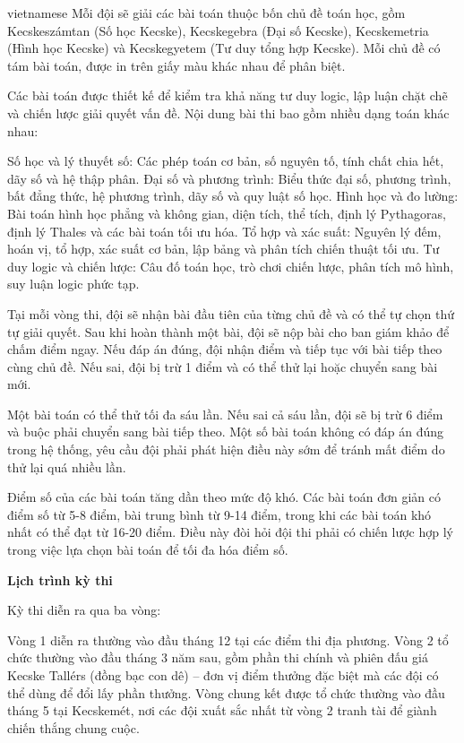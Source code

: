 \documentclass{article}
\begin{document}
\begin{otherlanguage*}{vietnamese}
Mỗi đội sẽ giải các bài toán thuộc bốn chủ đề toán học, gồm Kecskeszámtan (Số học Kecske), Kecskegebra (Đại số Kecske),
Kecskemetria (Hình học Kecske) và Kecskegyetem (Tư duy tổng hợp Kecske). Mỗi chủ đề có tám bài toán, được in trên giấy màu khác nhau để phân biệt.

Các bài toán được thiết kế để kiểm tra khả năng tư duy logic, lập luận chặt chẽ và chiến lược giải quyết vấn đề. Nội dung bài thi bao gồm nhiều dạng toán khác nhau:
\begin{itemize}[topsep=0pt, partopsep=0pt, itemsep=0pt]
    \ii Số học và lý thuyết số: Các phép toán cơ bản, số nguyên tố, tính chất chia hết, dãy số và hệ thập phân.
    \ii Đại số và phương trình: Biểu thức đại số, phương trình, bất đẳng thức, hệ phương trình, dãy số và quy luật số học.
    \ii Hình học và đo lường: Bài toán hình học phẳng và không gian, diện tích, thể tích, định lý Pythagoras, định lý Thales và các bài toán tối ưu hóa.
    \ii Tổ hợp và xác suất: Nguyên lý đếm, hoán vị, tổ hợp, xác suất cơ bản, lập bảng và phân tích chiến thuật tối ưu.
    \ii Tư duy logic và chiến lược: Câu đố toán học, trò chơi chiến lược, phân tích mô hình, suy luận logic phức tạp.
\end{itemize}

Tại mỗi vòng thi, đội sẽ nhận bài đầu tiên của từng chủ đề và có thể tự chọn thứ tự giải quyết. Sau khi hoàn thành một bài, đội sẽ nộp bài cho ban giám khảo để chấm điểm ngay.
Nếu đáp án đúng, đội nhận điểm và tiếp tục với bài tiếp theo cùng chủ đề. Nếu sai, đội bị trừ 1 điểm và có thể thử lại hoặc chuyển sang bài mới.

Một bài toán có thể thử tối đa sáu lần. Nếu sai cả sáu lần, đội sẽ bị trừ 6 điểm và buộc phải chuyển sang bài tiếp theo.
Một số bài toán không có đáp án đúng trong hệ thống, yêu cầu đội phải phát hiện điều này sớm để tránh mất điểm do thử lại quá nhiều lần.

Điểm số của các bài toán tăng dần theo mức độ khó. Các bài toán đơn giản có điểm số từ 5-8 điểm, bài trung bình từ 9-14 điểm,
trong khi các bài toán khó nhất có thể đạt từ 16-20 điểm. Điều này đòi hỏi đội thi phải có chiến lược hợp lý trong việc lựa chọn bài toán để tối đa hóa điểm số.

\textbf{Lịch trình kỳ thi}

Kỳ thi diễn ra qua ba vòng:
\begin{enumerate}[topsep=0pt, partopsep=0pt, itemsep=0pt]
    \ii Vòng 1 diễn ra thường vào đầu tháng 12 tại các điểm thi địa phương.
    \ii Vòng 2 tổ chức thường vào đầu tháng 3 năm sau,
    gồm phần thi chính và phiên đấu giá Kecske Tallérs (đồng bạc con dê) – đơn vị điểm thưởng đặc biệt mà các đội có thể dùng để đổi lấy phần thưởng.
    \ii Vòng chung kết được tổ chức thường vào đầu tháng 5 tại Kecskemét, nơi các đội xuất sắc nhất từ vòng 2 tranh tài để giành chiến thắng chung cuộc.
\end{enumerate}


\end{otherlanguage*}
\end{document}
